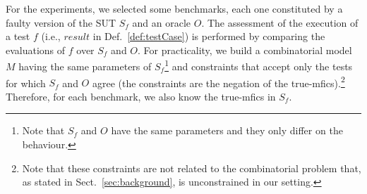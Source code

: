 \documentclass[
12pt, %
oneside, %
english, %
singlespacing, %
headsepline, %
consistentlayout, %
]{MastersDoctoralThesis} %
\newcommand{\truemfics}{true-\textsf{mfics}\xspace}
\newcommand{\result}{\ensuremath{\mathit{result}}\xspace}
\theoremstyle{plain}
\theoremstyle{definition}
\theoremstyle{remark}
\theoremstyle{plain}
\theoremstyle{plain}
\theoremstyle{remark}
\begin{document}

For the experiments, we selected some benchmarks, each one constituted by a faulty version of the SUT $S_f$ and an oracle $O$. The assessment of the execution of a test $f$ (i.e., \result in Def.~\ref{def:testCase}) is performed by comparing the evaluations of $f$ over $S_f$ and $O$. For practicality, we build a combinatorial model $M$ having the same parameters of $S_f$\footnote{Note that $S_f$ and $O$ have the same parameters and they only differ on the behaviour.} and constraints that accept only the tests for which $S_f$ and $O$ agree (the constraints are the negation of the \truemfics).\footnote{Note that these constraints are not related to the combinatorial problem that, as stated in Sect.~\ref{sec:background}, is unconstrained in our setting.} Therefore, for each benchmark, we also know the \truemfics in $S_f$.
\end{document}
